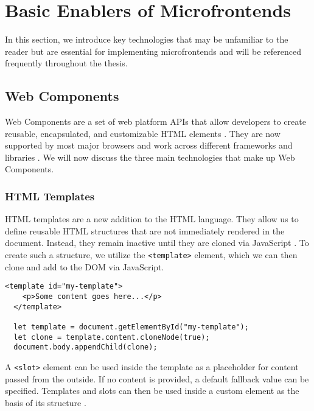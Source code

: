 \section{Basic Enablers of Microfrontends}
In this section, we introduce key technologies that may be unfamiliar to the reader but are essential for implementing microfrontends and will be referenced frequently throughout the thesis.

\subsection{Web Components}
Web Components are a set of web platform APIs that allow developers to create reusable, encapsulated, and customizable HTML elements \cite{MDNWebComponents}. They are now supported by most major browsers and work across different frameworks and libraries \cite{EisenbergWebComponents}. We will now discuss the three main technologies that make up Web Components.

\subsubsection{HTML Templates}
HTML templates are a new addition to the HTML language. They allow us to define reusable HTML structures that are not immediately rendered in the document. Instead, they remain inactive until they are cloned via JavaScript \cite{MDNWebComponents}. To create such a structure, we utilize the \texttt{<template>} element, which we can then clone and add to the DOM via JavaScript.
\begin{lstlisting}[caption={Example of using HTML template element}]
  <template id="my-template">
    <p>Some content goes here...</p>
  </template>

  let template = document.getElementById("my-template");
  let clone = template.content.cloneNode(true);
  document.body.appendChild(clone);
\end{lstlisting}
A \texttt{<slot>} element can be used inside the template as a placeholder for content passed from the outside. If no content is provided, a default fallback value can be specified. Templates and slots can then be used inside a custom element as the basis of its structure \cite{MDNWebComponents}. 

